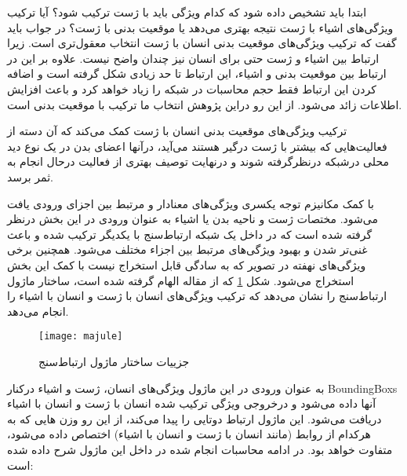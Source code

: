  ابتدا باید تشخیص داده شود که کدام ویژگی باید با ژست ترکیب شود؟ آیا ترکیب ویژگی‌های اشیاء با ژست نتیجه بهتری می‌دهد یا موقعیت بدنی با ژست؟ در جواب باید گفت که ترکیب ویژگی‌های موقعیت بدنی انسان با ژست انتخاب معقول‌تری است. زیرا ارتباط بین اشیاء و ژست حتی برای انسان نیز چندان واضح نیست. علاوه‌ بر این در ارتباط بین موقعیت بدنی و اشیاء، این ارتباط تا حد زیادی شکل گرفته است و اضافه کردن این ارتباط فقط حجم محاسبات در شبکه را زیاد خواهد کرد و باعث افزایش اطلاعات زائد می‌شود. از این رو دراین پژوهش انتخاب ما ترکیب با موقعیت بدنی است.
 
  ترکیب ویژگی‌های موقعیت بدنی انسان با ژست کمک می‌کند که آن دسته از فعالیت‌هایی که بیشتر با ژست درگیر هستند می‌آید، درآنها اعضای بدن در یک نوع دید محلی درشبکه درنظرگرفته شوند و درنهایت توصیف بهتری از فعالیت درحال انجام به ثمر برسد.
 
 با کمک مکانیزم توجه یکسری ویژگی‌های معنادار و مرتبط بین اجزای ورودی یافت می‌شود. مختصات ژست و ناحیه بدن یا اشیاء به عنوان ورودی‌ در این بخش درنظر گرفته شده است که در داخل یک شبکه ارتباط‌سنج با یکدیگر ترکیب شده و باعث غنی‌تر شدن و بهبود ویژگی‌های مرتبط بین اجزاء مختلف می‌شود. همچنین برخی ویژگی‌های نهفته در تصویر که به سادگی قابل استخراج نیست با کمک این بخش استخراج می‌شود. شکل %
 \ref{fig:majule}
 که از مقاله %
 \cite{Human_object_relation_action}
 الهام گرفته شده است،
 ساختار ماژول ارتباط‌سنج را نشان می‌دهد که ترکیب ویژگی‌های انسان با ژست و انسان با اشیاء را انجام می‌دهد. 
  \begin{figure}[ht]
 	\centerline{\texttt{[image: majule]}}
 	\caption{جزییات ساختار ماژول ارتباط‌سنج}
 	\label{fig:majule}
 \end{figure}
 
 به عنوان ورودی در این ماژول ویژگی‌های انسان، ژست و اشیاء درکنار 
 \glspl{BoundingBox}
 آنها داده می‌شود و درخروجی ویژگی ترکیب شده انسان با ژست و انسان با اشیاء دریافت می‌شود. این ماژول ارتباط دوتایی را پیدا می‌کند،‌ از این رو وزن هایی که به هرکدام از روابط (مانند انسان با ژست و انسان با اشیاء) اختصاص داده می‌شود، متفاوت خواهد بود. در ادامه محاسبات انجام شده در داخل این ماژول شرح داده شده است:
 
